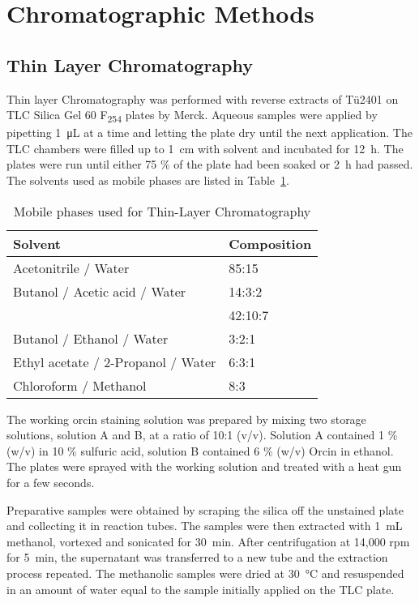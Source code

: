 \section{Chromatographic Methods} %
\label{sec:chromatographic_methods}

	\subsection{Thin Layer Chromatography} %
	\label{sub:thin_layer_chromatography}
	Thin layer Chromatography was performed with reverse extracts of T\"u2401 on TLC Silica Gel 60 F\textsubscript{254} plates by Merck.
	Aqueous samples were applied by pipetting \SI{1}{\micro\liter} at a time and letting the plate dry until the next application. The TLC chambers were filled up to \SI{1}{\centi\meter} with solvent and incubated for \SI{12}{\hour}. The plates were run until either 75 \% of the plate had been soaked or \SI{2}{\hour} had passed. The solvents used as mobile phases are listed in Table~\ref{tab:tlc_solvents}.

	\begin{table}[h]
		\caption{Mobile phases used for Thin-Layer Chromatography}
		\label{tab:tlc_solvents}
		\centering
		\begin{tabularx}{\textwidth}{XX}
			\toprule
			\textbf{Solvent}			& \textbf{Composition}	\\
			\midrule
			Acetonitrile / Water				& 85:15		\\
			Butanol / Acetic acid / Water		& 14:3:2	\\
												& 42:10:7	\\
			Butanol / Ethanol / Water			& 3:2:1		\\
			Ethyl acetate / 2-Propanol / Water	& 6:3:1		\\
			Chloroform / Methanol				& 8:3		\\
			\bottomrule
		\end{tabularx}
	\end{table}

	The working orcin staining solution was prepared by mixing two storage solutions, solution A and B, at a ratio of 10:1 (v/v). Solution A contained 1 \% (w/v)  in 10 \% sulfuric acid, solution B contained 6 \% (w/v) Orcin in ethanol. The plates were sprayed with the working solution and treated with a heat gun for a few seconds.

	Preparative samples were obtained by scraping the silica off the unstained plate and collecting it in reaction tubes. The samples were then extracted with \SI{1}{\milli\liter} methanol, vortexed and sonicated for \SI{30}{\minute}. After centrifugation at 14,000 rpm for \SI{5}{\minute}, the supernatant was transferred to a new tube and the extraction process repeated. The methanolic samples were dried at \SI{30}{\celsius} and resuspended in an amount of water equal to the sample initially applied on the TLC plate.

